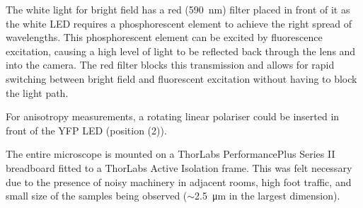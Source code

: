 \documentclass[../main.tex]{subfiles}
\begin{document}
The white light for bright field has a red (\SI{590}{\nano\meter}) filter placed in front of it as the white LED requires a phosphorescent element to achieve the right spread of wavelengths. This phosphorescent element can be excited by fluorescence excitation, causing a high level of light to be reflected back through the lens and into the camera. The red filter blocks this transmission and allows for rapid switching between bright field and fluorescent excitation without having to block the light path.

For anisotropy measurements, a rotating linear polariser could be inserted in front of the YFP LED (position (2)).

The entire microscope is mounted on a ThorLabs PerformancePlus Series II breadboard fitted to a ThorLabs Active Isolation frame. This was felt necessary due to the presence of noisy machinery in adjacent rooms, high foot traffic, and small size of the samples being observed (\(\sim\)\SI{2.5}{\micro\meter} in the largest dimension).
\end{document}
